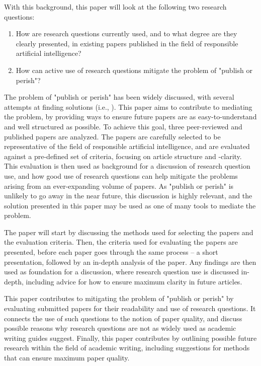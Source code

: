 With this background, this paper will look at the following two research questions:
\begin{enumerate}
    \item How are research questions currently used, and to what degree are they clearly presented, in existing papers published in the field of responsible artificial intelligence?
    \item How can active use of research questions mitigate the problem of "publish or perish"?
\end{enumerate}

The problem of "publish or perish" has been widely discussed, with several attempts at finding solutions (i.e., \cite{Grimes_2018,Davies_2017,Bornmann_2015}). This paper aims to contribute to mediating the problem, by providing ways to ensure future papers are as easy-to-understand and well structured as possible. To achieve this goal, three peer-reviewed and published papers are analyzed. The papers are carefully selected to be representative of the field of responsible artificial intelligence, and are evaluated against a pre-defined set of criteria, focusing on article structure and -clarity. This evaluation is then used as background for a discussion of research question use, and how good use of research questions can help mitigate the problems arising from an ever-expanding volume of papers. As "publish or perish" is unlikely to go away in the near future, this discussion is highly relevant, and the solution presented in this paper may be used as one of many tools to mediate the problem.

The paper will start by discussing the methods used for selecting the papers and the evaluation criteria. Then, the criteria used for evaluating the papers are presented, before each paper goes through the same process -- a short presentation, followed by an in-depth analysis of the paper. Any findings are then used as foundation for a discussion, where research question use is discussed in-depth, including advice for how to ensure maximum clarity in future articles.

This paper contributes to mitigating the problem of "publish or perish" by evaluating submitted papers for their readability and use of research questions. It connects the use of such questions to the notion of paper quality, and discuss possible reasons why research questions are not as widely used as academic writing guides suggest. Finally, this paper contributes by outlining possible future research within the field of academic writing, including suggestions for methods that can ensure maximum paper quality.